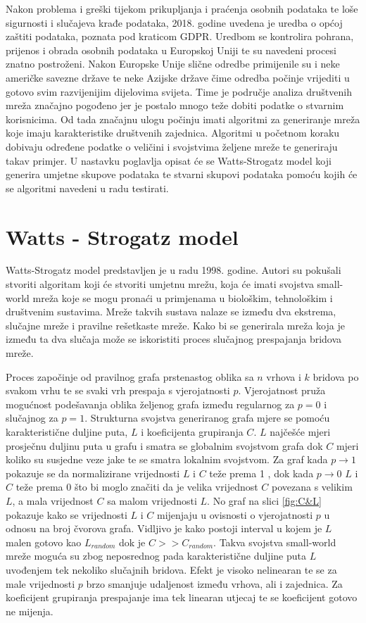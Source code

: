 \documentclass[times, utf8, diplomski]{fer}
\begin{document}
Nakon problema i greški tijekom prikupljanja i praćenja osobnih podataka te loše sigurnosti i slučajeva krađe podataka, 2018. godine uvedena je uredba o općoj zaštiti podataka, poznata pod kraticom GDPR. Uredbom se kontrolira pohrana, prijenos i obrada osobnih podataka u Europskoj Uniji te su navedeni procesi znatno postroženi. Nakon Europske Unije slične odredbe primijenile su i neke američke savezne države te neke Azijske države čime odredba počinje vrijediti u gotovo svim razvijenijim dijelovima svijeta. Time je područje analiza društvenih mreža značajno pogođeno jer je postalo mnogo teže dobiti podatke o stvarnim korisnicima. Od tada značajnu ulogu počinju imati algoritmi za generiranje mreža koje imaju karakteristike društvenih zajednica. Algoritmi u početnom koraku dobivaju određene podatke o veličini i svojstvima željene mreže te generiraju takav primjer. U nastavku poglavlja opisat će se Watts-Strogatz model koji generira umjetne skupove podataka te stvarni skupovi podataka pomoću kojih će se algoritmi navedeni u radu testirati.



\section{Watts - Strogatz model}

Watts-Strogatz model predstavljen je u radu \cite{watts1998collective} 1998. godine. Autori su pokušali stvoriti algoritam koji će stvoriti umjetnu mrežu, koja će imati svojstva small-world mreža koje se mogu pronaći u primjenama u biološkim, tehnološkim i društvenim sustavima. Mreže takvih sustava nalaze se između dva ekstrema, slučajne mreže i pravilne rešetkaste mreže. Kako bi se generirala mreža koja je između ta dva slučaja može se iskoristiti proces slučajnog prespajanja bridova mreže. 

Proces započinje od pravilnog grafa prstenastog oblika sa $n$ vrhova i $k$ bridova po svakom vrhu te se svaki vrh prespaja s vjerojatnosti $p$. Vjerojatnost pruža mogućnost podešavanja oblika željenog grafa između regularnog za $p = 0$ i slučajnog za $p = 1$. Strukturna svojstva generiranog grafa mjere se pomoću karakteristične duljine puta, $L$ i koeficijenta grupiranja $C$. $L$ najčešće mjeri prosječnu duljinu puta u grafu i smatra se globalnim svojstvom grafa dok $C$ mjeri koliko su susjedne veze jake te se smatra lokalnim svojstvom. Za graf kada $p \rightarrow 1$ pokazuje se da normalizirane vrijednosti $L$ i $C$ teže prema 1 , dok kada $p \rightarrow 0$ $L$ i $C$ teže prema 0 što bi moglo značiti da je velika vrijednost $C$ povezana s velikim $L$, a mala vrijednost $C$ sa malom vrijednosti $L$. No graf na slici \ref{fig:C&L} pokazuje kako se vrijednosti $L$ i $C$ mijenjaju u ovisnosti o vjerojatnosti $p$ u odnosu na broj čvorova grafa. Vidljivo je kako postoji interval u kojem je $L$ malen gotovo kao $L_{random}$ dok je $C >> C_{random}$. Takva svojstva small-world mreže moguća su zbog neposrednog pada karakteristične duljine puta $L$ uvođenjem tek nekoliko slučajnih bridova. Efekt je visoko nelinearan te se za male vrijednosti $p$ brzo smanjuje udaljenost između vrhova, ali i zajednica. Za koeficijent grupiranja prespajanje ima tek linearan utjecaj te se koeficijent gotovo ne mijenja. 
\end{document}
